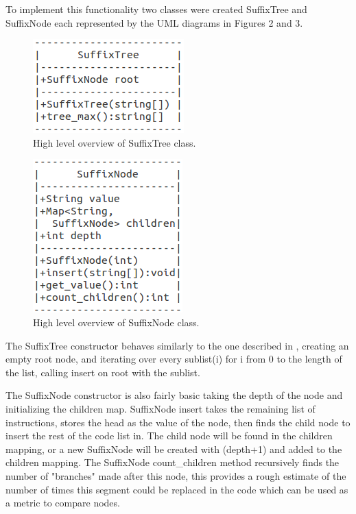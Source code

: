 \documentclass[9pt,nocopyrightspace]{sigplanconf}
\begin{document}
To implement this functionality two classes were created SuffixTree and SuffixNode each represented by the UML diagrams in Figures 2 and 3. 

\begin{figure}
\begin{center}
\includegraphics{tree}
\caption{High level overview of SuffixTree class.}
\end{center}
\end{figure}

\begin{figure}
\begin{center}
\includegraphics{node}
\caption{High level overview of SuffixNode class.}
\end{center}
\end{figure}

The SuffixTree constructor behaves similarly to the one described in \cite{ctci01}, creating an empty root node, and iterating over every sublist(i) for i from 0 to the length of the list, calling insert on root with the sublist. 

The SuffixNode constructor is also fairly basic taking the depth of the node and initializing the children map.
SuffixNode insert takes the remaining list of instructions, stores the head as the value of the node, then finds the child node to insert the rest of the code list in.
The child node will be found in the children mapping, or a new SuffixNode will be created with (depth+1) and added to the children mapping.
The SuffixNode count\_children method recursively finds the number of "branches" made after this node, this provides a rough estimate of the number of times this segment could be replaced in the code which can be used as a metric to compare nodes.
\end{document}
